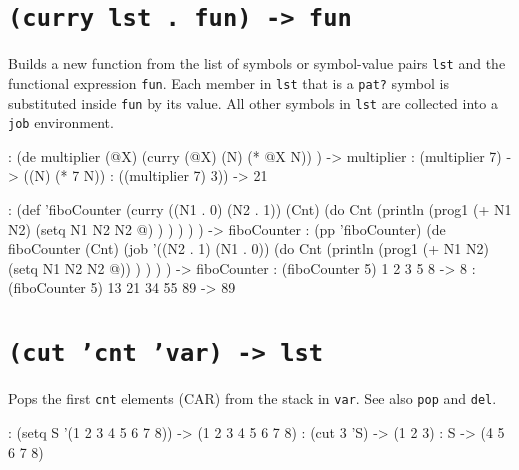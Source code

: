 
\section*{\texttt{(curry lst . fun) -> fun}}
\label{sec:funct-rec-C-(curry-lst-.-fun)-->-fun}


Builds a new function from the list of symbols or symbol-value pairs
\texttt{lst} and the functional expression \texttt{fun}. Each member in \texttt{lst} that is
a \texttt{pat?} symbol is substituted inside \texttt{fun} by its value. All other
symbols in \texttt{lst} are collected into a \texttt{job} environment.


\begin{wideverbatim}
: (de multiplier (@X)
   (curry (@X) (N) (* @X N)) )
-> multiplier
: (multiplier 7)
-> ((N) (* 7 N))
: ((multiplier 7) 3))
-> 21

: (def 'fiboCounter
   (curry ((N1 . 0) (N2 . 1)) (Cnt)
      (do Cnt
         (println
            (prog1
               (+ N1 N2)
               (setq N1 N2  N2 @) ) ) ) ) )
-> fiboCounter
: (pp 'fiboCounter)
(de fiboCounter (Cnt)
   (job '((N2 . 1) (N1 . 0))
      (do Cnt
         (println
            (prog1 (+ N1 N2) (setq N1 N2 N2 @)) ) ) ) )
-> fiboCounter
: (fiboCounter 5)
1
2
3
5
8
-> 8
: (fiboCounter 5)
13
21
34
55
89
-> 89
\end{wideverbatim}

 
\section*{\texttt{(cut 'cnt 'var) -> lst}}
\label{sec:funct-rec-C-(cut-'cnt-'var)-->-lst}


Pops the first \texttt{cnt} elements (CAR) from the stack in \texttt{var}. See also
\texttt{pop} and \texttt{del}.


\begin{wideverbatim}
: (setq S '(1 2 3 4 5 6 7 8))
-> (1 2 3 4 5 6 7 8)
: (cut 3 'S)
-> (1 2 3)
: S
-> (4 5 6 7 8)
\end{wideverbatim}

